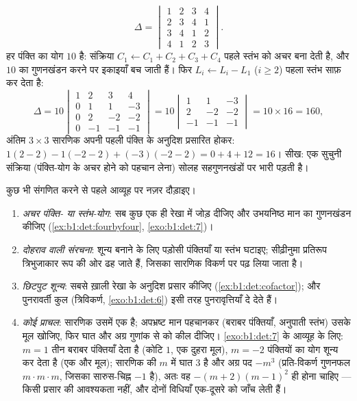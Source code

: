 \begin{example}
\label{ex:b1:det:fourbyfour}
\[
\Delta = \begin{vmatrix}
1 & 2 & 3 & 4\\
2 & 3 & 4 & 1\\
3 & 4 & 1 & 2\\
4 & 1 & 2 & 3
\end{vmatrix}.
\]
हर पंक्ति का योग $10$ है: संक्रिया $C_1 \leftarrow C_1 + C_2 + C_3 + C_4$
पहले स्तंभ को अचर बना देती है, और $10$ का गुणनखंडन करने पर इकाइयाँ बच जाती
हैं। फिर $L_i \leftarrow L_i - L_1$ ($i \geq 2$) पहला स्तंभ साफ़ कर देता है:
\[
\Delta = 10\begin{vmatrix}
1 & 2 & 3 & 4\\
0 & 1 & 1 & -3\\
0 & 2 & -2 & -2\\
0 & -1 & -1 & -1
\end{vmatrix}
= 10\begin{vmatrix}
1 & 1 & -3\\
2 & -2 & -2\\
-1 & -1 & -1
\end{vmatrix}
= 10 \times 16 = 160,
\]
अंतिम $3\times3$ सारणिक अपनी पहली पंक्ति के अनुदिश प्रसारित होकर: $1(2 - 2)
- 1(-2 - 2) + (-3)(-2 - 2) = 0 + 4 + 12 = 16$। सीख: एक सुचुनी संक्रिया
(पंक्ति-योग के अचर होने को पहचान लेना) सोलह सहगुणनखंडों पर भारी पड़ती है।
\end{example}

\begin{method}[सारणिक की रणनीति चुनना]
\label{met:b1:det:strategy}
कुछ भी संगणित करने से पहले आव्यूह पर नज़र दौड़ाइए।
\begin{enumerate}
  \item \emph{अचर पंक्ति- या स्तंभ-योग}: सब कुछ एक ही रेखा में जोड़ दीजिए और
  उभयनिष्ठ मान का गुणनखंडन कीजिए (\cref{ex:b1:det:fourbyfour},
  \cref{exo:b1:det:7})।
  \item \emph{दोहराव वाली संरचना}: शून्य बनाने के लिए पड़ोसी पंक्तियाँ या
  स्तंभ घटाइए; सीढ़ीनुमा प्रतिरूप त्रिभुजाकार रूप की ओर ढह जाते हैं, जिसका
  सारणिक विकर्ण पर पढ़ लिया जाता है।
  \item \emph{छिटपुट शून्य}: सबसे ख़ाली रेखा के अनुदिश प्रसार कीजिए
  (\cref{ex:b1:det:cofactor}); और पुनरावर्ती कुल (त्रिविकर्ण,
  \cref{exo:b1:det:6}) इसी तरह पुनरावृत्तियाँ दे देते हैं।
  \item \emph{कोई प्राचल}: सारणिक उसमें एक  है; अपभ्रष्ट मान पहचानकर
  (बराबर पंक्तियाँ, अनुपाती स्तंभ) उसके मूल खोजिए, फिर घात और अग्र गुणांक से
   को कील दीजिए। \cref{exo:b1:det:7} के आव्यूह के लिए: $m = 1$ तीन
  बराबर पंक्तियाँ देता है (कोटि $1$, एक दुहरा मूल), $m = -2$ पंक्तियों का
  योग शून्य कर देता है (एक और मूल); सारणिक की $m$ में घात $3$ है और अग्र पद
  $-m^3$ (प्रति-विकर्ण गुणनफल $m\cdot m\cdot m$, जिसका सारुस-चिह्न $-1$ है),
  अतः वह $-(m+2)(m-1)^2$ ही होना चाहिए --- किसी प्रसार की आवश्यकता नहीं, और
  दोनों विधियाँ एक-दूसरे को जाँच लेती हैं।
\end{enumerate}
\end{method}

